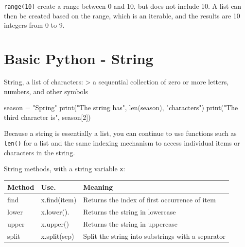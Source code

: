 \documentclass[
  letterpaper,
]{scrbook}
\newenvironment{Shaded}{\begin{snugshade}}{\end{snugshade}}
\newcommand{\BuiltInTok}[1]{\textcolor[rgb]{0.00,0.23,0.31}{#1}}
\newcommand{\DecValTok}[1]{\textcolor[rgb]{0.68,0.00,0.00}{#1}}
\newcommand{\NormalTok}[1]{\textcolor[rgb]{0.00,0.23,0.31}{#1}}
\newcommand{\OperatorTok}[1]{\textcolor[rgb]{0.37,0.37,0.37}{#1}}
\newcommand{\StringTok}[1]{\textcolor[rgb]{0.13,0.47,0.30}{#1}}
\newcounter{none} %
\begin{document}
\texttt{range(10)} create a range between 0 and 10, but does not include
10. A list can then be created based on the range, which is an iterable,
and the results are 10 integers from 0 to 9.

\section*{Basic Python - String}\label{basic-python---string}


String, a list of characters: \textgreater{} a sequential collection of
zero or more letters, numbers, and other symbols

\begin{Shaded}
\begin{Highlighting}[]
\NormalTok{season }\OperatorTok{=} \StringTok{"Spring"}
\BuiltInTok{print}\NormalTok{(}\StringTok{"The string has"}\NormalTok{, }\BuiltInTok{len}\NormalTok{(season), }\StringTok{"characters"}\NormalTok{)}
\BuiltInTok{print}\NormalTok{(}\StringTok{"The third character is"}\NormalTok{, season[}\DecValTok{2}\NormalTok{])}
\end{Highlighting}
\end{Shaded}

Because a string is essentially a list, you can continue to use
functions such as \texttt{len()} for a list and the same indexing
mechanism to access individual items or characters in the string.

String methods, with a string variable \texttt{x}:

{\def\LTcaptype{none} %
\begin{longtable}[]{@{}
  >{\raggedright\arraybackslash}p{}
  >{\raggedright\arraybackslash}p{}
  >{\raggedright\arraybackslash}p{}@{}}
\toprule\noalign{}
\begin{minipage}[b]{\linewidth}\raggedright
Method
\end{minipage} & \begin{minipage}[b]{\linewidth}\raggedright
Use.
\end{minipage} & \begin{minipage}[b]{\linewidth}\raggedright
Meaning
\end{minipage} \\
\midrule\noalign{}
\endhead
\bottomrule\noalign{}
\endlastfoot
find & x.find(item) & Returns the index of first occurrence of item \\
lower & x.lower(). & Returns the string in lowercase \\
upper & x.upper() & Returns the string in uppercase \\
split & x.split(sep) & Split the string into substrings with a
separator \\
\end{longtable}
}
\end{document}
